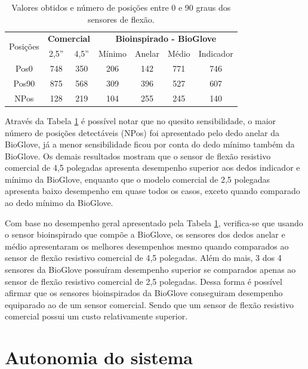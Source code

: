 \documentclass[
	12pt,				%
	openright,			%
	oneside,			%
	a4paper,			%
	english,			%
	brazil				%
	]{abntex2}
\begin{document}
\begin{table}[H]
	\centering	
	\caption{Valores obtidos e número de posições entre 0 e 90 graus dos sensores de flexão.}
		\begin{tabular}{c|cc|cccc} 
			\midrule
\multirow{2}{*}{Posições} & \multicolumn{2}{c|}{\textbf{Comercial}} & \multicolumn{4}{c}{\textbf{Bioinspirado - BioGlove}}\\
			    		& 2,5'' 	& 4,5'' 	& Mínimo 	& Anelar 	& Médio & Indicador \\
		  \midrule
			Pos0 		& 748 		& 350 		& 206 		&	142			&	771		&	746				\\
			Pos90 	& 875 		& 568 		& 309 		&	396			&	527		&	607				\\
			NPos 		& 128 		& 219 		& 104 		&	255			&	245		&	140				\\
		  \midrule
		\end{tabular}
	\label{Tab:NPos0-90}	
\end{table}

		Através da Tabela \ref{Tab:NPos0-90} é possível notar que no quesito sensibilidade, o maior número de posições detectáveis (NPos) foi apresentado pelo dedo anelar da BioGlove, já a menor sensibilidade ficou por conta do dedo mínimo também da BioGlove. Os demais resultados mostram que o sensor de flexão resistivo comercial de 4,5 polegadas apresenta desempenho superior aos dedos indicador e mínimo da BioGlove, enquanto que o modelo comercial de 2,5 polegadas apresenta baixo desempenho em quase todos os casos, exceto quando comparado ao dedo mínimo da BioGlove.

		Com base no desempenho geral apresentado pela Tabela \ref{Tab:NPos0-90}, verifica-se que usando o sensor bioinspirado que compõe a BioGlove, os sensores dos dedos anelar e médio apresentaram os melhores desempenhos mesmo quando comparados ao sensor de flexão resistivo comercial de 4,5 polegadas. Além do mais, 3 dos 4 sensores da BioGlove possuíram desempenho superior se comparados apenas ao sensor de flexão resistivo comercial de 2,5 polegadas. Dessa forma é possível afirmar que os sensores bioinspirados da BioGlove conseguiram desempenho equiparado ao de um sensor comercial. Sendo que um sensor de flexão resistivo comercial possui um custo relativamente superior.


			\section{Autonomia do sistema}
\end{document}
